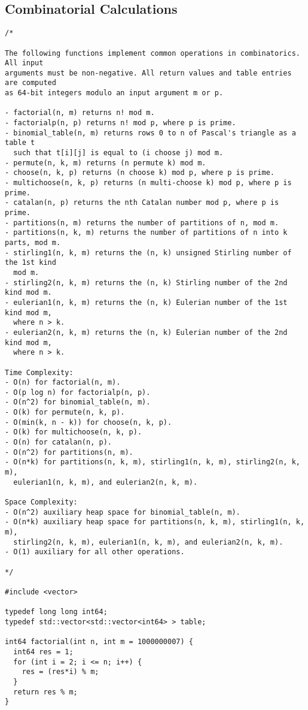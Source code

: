\subsection{Combinatorial Calculations}
\begin{lstlisting}
/*

The following functions implement common operations in combinatorics. All input
arguments must be non-negative. All return values and table entries are computed
as 64-bit integers modulo an input argument m or p.

- factorial(n, m) returns n! mod m.
- factorialp(n, p) returns n! mod p, where p is prime.
- binomial_table(n, m) returns rows 0 to n of Pascal's triangle as a table t
  such that t[i][j] is equal to (i choose j) mod m.
- permute(n, k, m) returns (n permute k) mod m.
- choose(n, k, p) returns (n choose k) mod p, where p is prime.
- multichoose(n, k, p) returns (n multi-choose k) mod p, where p is prime.
- catalan(n, p) returns the nth Catalan number mod p, where p is prime.
- partitions(n, m) returns the number of partitions of n, mod m.
- partitions(n, k, m) returns the number of partitions of n into k parts, mod m.
- stirling1(n, k, m) returns the (n, k) unsigned Stirling number of the 1st kind
  mod m.
- stirling2(n, k, m) returns the (n, k) Stirling number of the 2nd kind mod m.
- eulerian1(n, k, m) returns the (n, k) Eulerian number of the 1st kind mod m,
  where n > k.
- eulerian2(n, k, m) returns the (n, k) Eulerian number of the 2nd kind mod m,
  where n > k.

Time Complexity:
- O(n) for factorial(n, m).
- O(p log n) for factorialp(n, p).
- O(n^2) for binomial_table(n, m).
- O(k) for permute(n, k, p).
- O(min(k, n - k)) for choose(n, k, p).
- O(k) for multichoose(n, k, p).
- O(n) for catalan(n, p).
- O(n^2) for partitions(n, m).
- O(n*k) for partitions(n, k, m), stirling1(n, k, m), stirling2(n, k, m),
  eulerian1(n, k, m), and eulerian2(n, k, m).

Space Complexity:
- O(n^2) auxiliary heap space for binomial_table(n, m).
- O(n*k) auxiliary heap space for partitions(n, k, m), stirling1(n, k, m),
  stirling2(n, k, m), eulerian1(n, k, m), and eulerian2(n, k, m).
- O(1) auxiliary for all other operations.

*/

#include <vector>

typedef long long int64;
typedef std::vector<std::vector<int64> > table;

int64 factorial(int n, int m = 1000000007) {
  int64 res = 1;
  for (int i = 2; i <= n; i++) {
    res = (res*i) % m;
  }
  return res % m;
}


\end{lstlisting}

